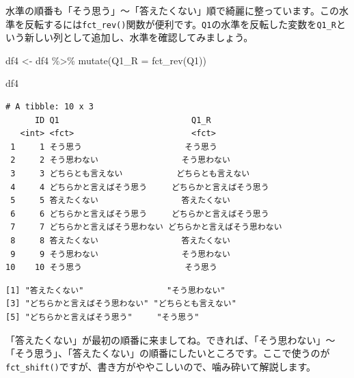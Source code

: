 \documentclass[
  a4paper,
  pandoc,
  ja=standard,
  jafont=haranoaji]{bxjsbook}
\newenvironment{Shaded}{\begin{snugshade}}{\end{snugshade}}
\newcommand{\AttributeTok}[1]{\textcolor[rgb]{0.00,0.48,0.65}{#1}}
\newcommand{\FunctionTok}[1]{\textcolor[rgb]{0.28,0.35,0.67}{#1}}
\newcommand{\NormalTok}[1]{\textcolor[rgb]{0.00,0.48,0.65}{#1}}
\newcommand{\OtherTok}[1]{\textcolor[rgb]{0.00,0.48,0.65}{#1}}
\newcommand{\SpecialCharTok}[1]{\textcolor[rgb]{0.37,0.37,0.37}{#1}}
\begin{document}
水準の順番も「そう思う」〜「答えたくない」順で綺麗に整っています。この水準を反転するには\texttt{fct\_rev()}関数が便利です。\texttt{Q1}の水準を反転した変数を\texttt{Q1\_R}という新しい列として追加し、水準を確認してみましょう。

\begin{Shaded}
\begin{Highlighting}[numbers=left,,]
\NormalTok{df4 }\OtherTok{\textless{}{-}}\NormalTok{ df4 }\SpecialCharTok{\%\textgreater{}\%}
  \FunctionTok{mutate}\NormalTok{(}\AttributeTok{Q1\_R =} \FunctionTok{fct\_rev}\NormalTok{(Q1))}

\NormalTok{df4}
\end{Highlighting}
\end{Shaded}

\begin{verbatim}
# A tibble: 10 x 3
      ID Q1                           Q1_R                        
   <int> <fct>                        <fct>                       
 1     1 そう思う                     そう思う                    
 2     2 そう思わない                 そう思わない                
 3     3 どちらとも言えない           どちらとも言えない          
 4     4 どちらかと言えばそう思う     どちらかと言えばそう思う    
 5     5 答えたくない                 答えたくない                
 6     6 どちらかと言えばそう思う     どちらかと言えばそう思う    
 7     7 どちらかと言えばそう思わない どちらかと言えばそう思わない
 8     8 答えたくない                 答えたくない                
 9     9 そう思わない                 そう思わない                
10    10 そう思う                     そう思う                    
\end{verbatim}

\begin{Shaded}
\end{Shaded}

\begin{verbatim}
[1] "答えたくない"                 "そう思わない"                
[3] "どちらかと言えばそう思わない" "どちらとも言えない"          
[5] "どちらかと言えばそう思う"     "そう思う"                    
\end{verbatim}

「答えたくない」が最初の順番に来ましてね。できれば、「そう思わない」〜「そう思う」、「答えたくない」の順番にしたいところです。ここで使うのが\texttt{fct\_shift()}ですが、書き方がややこしいので、噛み砕いて解説します。
\end{document}
